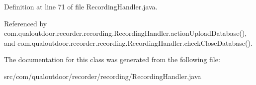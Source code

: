 Definition at line 71 of file Recording\-Handler.\-java.



Referenced by com.\-qualoutdoor.\-recorder.\-recording.\-Recording\-Handler.\-action\-Upload\-Database(), and com.\-qualoutdoor.\-recorder.\-recording.\-Recording\-Handler.\-check\-Close\-Database().



The documentation for this class was generated from the following file\-:\begin{DoxyCompactItemize}
\item 
src/com/qualoutdoor/recorder/recording/Recording\-Handler.\-java\end{DoxyCompactItemize}
